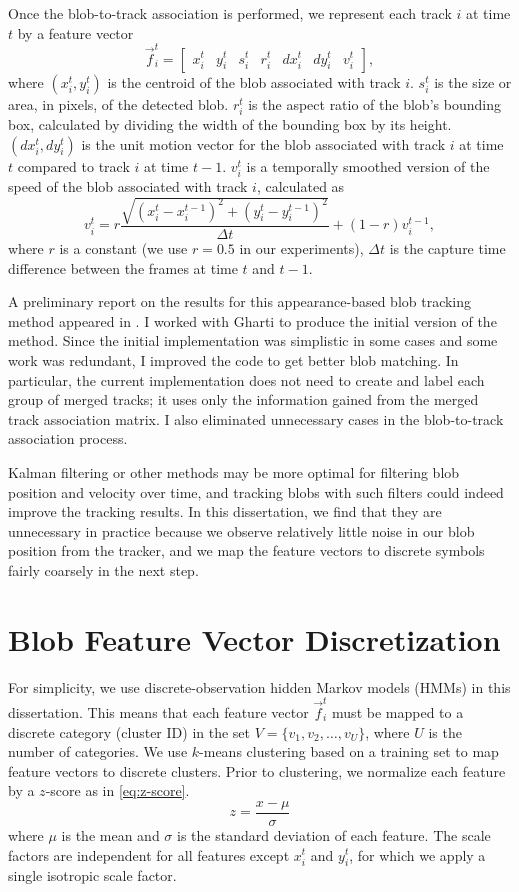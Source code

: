 Once the blob-to-track association is performed, we represent each
track $i$ at time $t$ by a feature vector
\[
    \vec{f}_i^t = \begin{bmatrix} x_i^t & y_i^t & s_i^t & r_i^t &
        dx_i^t & dy_i^t & v_i^t \end{bmatrix},
\]
where $(x_i^t, y_i^t)$ is the centroid of the blob associated with
track $i$. $s_i^t$ is the size or area, in pixels, of the detected
blob. $r_i^t$ is the aspect ratio of the blob's bounding box,
calculated by dividing the width of the bounding box by its height.
$(dx_i^t, dy_i^t)$ is the unit motion vector for the blob associated
with track $i$ at time $t$ compared to track $i$ at time
$t-1$. $v_i^t$ is a temporally smoothed version of the speed of the
blob associated with track $i$, calculated as
\[
    v_i^t = r \frac{{\sqrt {(x_i^t - x_i^{t - 1} )^2 + (y_i^t - y_i^{t -
        1} )^2 } }}{{\Delta t}} + (1 - r) v_i^{t-1},
\]
where $r$ is a constant (we use $r=0.5$ in our experiments), $\Delta
t$ is the capture time difference between the frames at time $t$ and
$t-1$.

A preliminary report on the results for this appearance-based blob
tracking method appeared in . I worked with
Gharti to produce the initial version of the method.  Since the
initial implementation was simplistic in some cases and some work was
redundant, I improved the code to get better blob matching.  
In particular, the current implementation does not need to create and 
label each group of merged tracks; it uses only the information gained 
from the merged track association matrix. I also eliminated unnecessary 
cases in the blob-to-track association process.

Kalman filtering or other methods may be more optimal for
filtering blob position and velocity over time, and tracking blobs 
with such filters could indeed improve the tracking results. 
In this dissertation, we find that they are unnecessary in 
practice because we observe relatively little noise in our blob 
position from the tracker, and we map the feature vectors to discrete 
symbols fairly coarsely in the next step.

\section{Blob Feature Vector Discretization}
\label{sec:blob-discretization}

For simplicity, we use discrete-observation hidden Markov models (HMMs) 
in this dissertation. This means that each feature vector $\vec{f}_i^t$ must
be mapped to a discrete category (cluster ID) in the set $V = \{ v_1,
v_2, \ldots, v_U \}$, where $U$ is the number of categories. We use
$k$-means clustering based on a training set to map feature vectors to
discrete clusters.  Prior to clustering, we normalize each feature by
a $z$-score as in \ref{eq:z-score}.  
\begin{equation}
    \label{eq:z-score}
    z = \frac{x - \mu}{\sigma}
\end{equation}
where $\mu$ is the mean and $\sigma$ is the standard deviation of each 
feature. The scale factors are independent for all features
except $x_i^t$ and $y_i^t$, for which we apply a single isotropic
scale factor.

